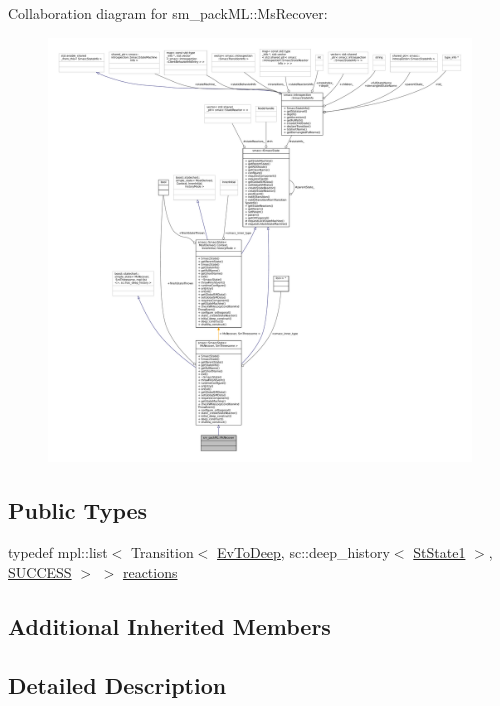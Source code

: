 Collaboration diagram for sm\+\_\+pack\+ML\+:\+:Ms\+Recover\+:
\nopagebreak
\begin{figure}[H]
\begin{center}
\leavevmode
\includegraphics[width=350pt]{classsm__packML_1_1MsRecover__coll__graph}
\end{center}
\end{figure}
\subsection*{Public Types}
\begin{DoxyCompactItemize}
\item 
typedef mpl\+::list$<$ Transition$<$ \hyperlink{structsm__packML_1_1EvToDeep}{Ev\+To\+Deep}, sc\+::deep\+\_\+history$<$ \hyperlink{structsm__packML_1_1StState1}{St\+State1} $>$, \hyperlink{classSUCCESS}{S\+U\+C\+C\+E\+SS} $>$ $>$ \hyperlink{classsm__packML_1_1MsRecover_a98651f27644e70929c7d1c976127d2f4}{reactions}
\end{DoxyCompactItemize}
\subsection*{Additional Inherited Members}


\subsection{Detailed Description}


